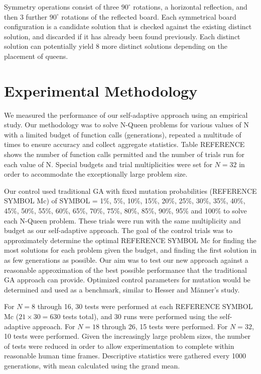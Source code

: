 \documentclass[conference]{IEEEtran}
\begin{document}
Symmetry operations consist of three $90^{\circ}$ rotations, a horizontal reflection, and then 3 further $90^{\circ}$ rotations of the reflected board. Each symmetrical board configuration is a candidate solution that is checked against the existing distinct solution, and discarded if it has already been found previously. Each distinct solution can potentially yield 8 more distinct solutions depending on the placement of queens.

\section{Experimental Methodology}
We measured the performance of our self-adaptive approach using an empirical study. Our methodology was to solve N-Queen problems for various values of N with a limited budget of function calls (generations), repeated a multitude of times to ensure accuracy and collect aggregate statistics. Table {REFERENCE} shows the number of function calls permitted and the number of trials run for each value of N. Special budgets and trial multiplicities were set for $N = 32$ in order to accommodate the exceptionally large problem size.

Our control used traditional GA with fixed mutation probabilities ({REFERENCE SYMBOL Mc}) of {SYMBOL} = 1\%, 5\%, 10\%, 15\%, 20\%, 25\%, 30\%, 35\%, 40\%, 45\%, 50\%, 55\%, 60\%, 65\%, 70\%, 75\%, 80\%, 85\%, 90\%, 95\% and 100\% to solve each N-Queen problem. These trials were run with the same multiplicity and budget as our self-adaptive approach. The goal of the control trials was to approximately determine the optimal {REFERENCE SYMBOL Mc} for finding the most solutions for each problem given the budget, and finding the first solution in as few generations as possible. Our aim was to test our new approach against a reasonable approximation of the best possible performance that the traditional GA approach can provide. Optimized control parameters for mutation would be determined and used as a benchmark, similar to Hesser and M\"{a}nner's study.

For $N = 8$ through 16, 30 tests were performed at each {REFERENCE SYMBOL Mc} ($21 \times 30 = 630$ tests total), and 30 runs were performed using the self-adaptive approach. For $N = 18$ through 26, 15 tests were performed. For $N = 32$, 10 tests were performed. Given the increasingly large problem sizes, the number of tests were reduced in order to allow experimentation to complete within reasonable human time frames. Descriptive statistics were gathered every 1000 generations, with mean calculated using the grand mean.
\end{document}
